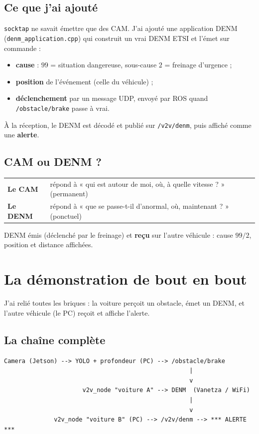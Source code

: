 \documentclass[a4paper,11pt]{article}
\newcommand{\code}[1]{\texttt{#1}}
\begin{document}
\subsection{Ce que j'ai ajouté}
\code{socktap} ne savait émettre que des CAM. J'ai ajouté une application DENM
(\code{denm\_application.cpp}) qui construit un vrai DENM ETSI et l'émet sur commande :
\begin{itemize}[leftmargin=1.6em]
  \item \textbf{cause} : $99$ = situation dangereuse, sous-cause $2$ = freinage d'urgence ;
  \item \textbf{position} de l'événement (celle du véhicule) ;
  \item \textbf{déclenchement} par un message UDP, envoyé par ROS quand
        \code{/obstacle/brake} passe à vrai.
\end{itemize}
À la réception, le DENM est décodé et publié sur \code{/v2v/denm}, puis affiché comme une
\textbf{alerte}.

\subsection{CAM ou DENM ?}
\begin{center}
\begin{tabularx}{\textwidth}{@{}l X@{}}
\toprule
\textbf{Le CAM} & répond à « qui est autour de moi, où, à quelle vitesse ? » (permanent) \\
\textbf{Le DENM} & répond à « que se passe-t-il d'anormal, où, maintenant ? » (ponctuel) \\
\bottomrule
\end{tabularx}
\end{center}

\begin{note}[Vérifié]
DENM émis (déclenché par le freinage) et \textbf{reçu} sur l'autre véhicule : cause $99/2$,
position et distance affichées.
\end{note}

\section{La démonstration de bout en bout}
J'ai relié toutes les briques : la voiture perçoit un obstacle, émet un DENM, et l'autre
véhicule (le PC) reçoit et affiche l'alerte.

\subsection{La chaîne complète}
\begin{lstlisting}
Camera (Jetson) --> YOLO + profondeur (PC) --> /obstacle/brake
                                                    |
                                                    v
                      v2v_node "voiture A" --> DENM  (Vanetza / WiFi)
                                                    |
                                                    v
              v2v_node "voiture B" (PC) --> /v2v/denm --> *** ALERTE ***
\end{lstlisting}
\end{document}
